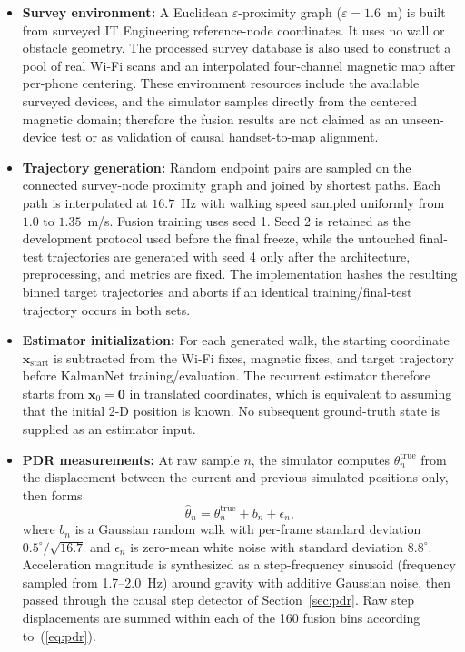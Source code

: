 \documentclass[conference]{IEEEtran}
\begin{document}
\begin{itemize}
    \item \textbf{Survey environment:} A Euclidean $\varepsilon$-proximity graph ($\varepsilon=1.6$~m) is built from surveyed IT Engineering reference-node coordinates. It uses no wall or obstacle geometry. The processed survey database is also used to construct a pool of real Wi-Fi scans and an interpolated four-channel magnetic map after per-phone centering. These environment resources include the available surveyed devices, and the simulator samples directly from the centered magnetic domain; therefore the fusion results are not claimed as an unseen-device test or as validation of causal handset-to-map alignment.
    \item \textbf{Trajectory generation:} Random endpoint pairs are sampled on the connected survey-node proximity graph and joined by shortest paths. Each path is interpolated at $16.7$~Hz with walking speed sampled uniformly from $1.0$ to $1.35$~m/s. Fusion training uses seed 1. Seed 2 is retained as the development protocol used before the final freeze, while the untouched final-test trajectories are generated with seed 4 only after the architecture, preprocessing, and metrics are fixed. The implementation hashes the resulting binned target trajectories and aborts if an identical training/final-test trajectory occurs in both sets.
    \item \textbf{Estimator initialization:} For each generated walk, the starting coordinate $\mathbf{x}_{\mathrm{start}}$ is subtracted from the Wi-Fi fixes, magnetic fixes, and target trajectory before KalmanNet training/evaluation. The recurrent estimator therefore starts from $\mathbf{x}_0=\mathbf{0}$ in translated coordinates, which is equivalent to assuming that the initial 2-D position is known. No subsequent ground-truth state is supplied as an estimator input.
    \item \textbf{PDR measurements:} At raw sample $n$, the simulator computes $\theta^{\mathrm{true}}_n$ from the displacement between the current and previous simulated positions only, then forms
    \begin{equation}
    \hat{\theta}_n=\theta^{\mathrm{true}}_n+b_n+\epsilon_n,
    \label{eq:sim_heading}
    \end{equation}
    where $b_n$ is a Gaussian random walk with per-frame standard deviation $0.5^{\circ}/\sqrt{16.7}$ and $\epsilon_n$ is zero-mean white noise with standard deviation $8.8^{\circ}$. Acceleration magnitude is synthesized as a step-frequency sinusoid (frequency sampled from 1.7--2.0~Hz) around gravity with additive Gaussian noise, then passed through the causal step detector of Section~\ref{sec:pdr}. Raw step displacements are summed within each of the 160 fusion bins according to~(\ref{eq:pdr}).

\end{itemize}
\end{document}
